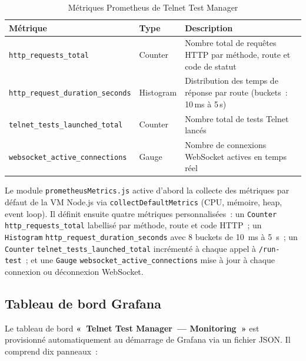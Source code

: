 \begin{table}[H]
  \centering
  \caption{Métriques Prometheus de Telnet Test Manager}
  \label{tab:prometheus_metrics}
  \begin{tabularx}{\textwidth}{|L{6.2cm}|L{2.3cm}|X|}
    \hline
    \textbf{Métrique} & \textbf{Type} & \textbf{Description} \\
    \hline
    {\small\texttt{http\_requests\_total}} & Counter &
      Nombre total de requêtes HTTP par méthode, route et code de statut \\
    \hline
    {\small\texttt{http\_request\_duration\_seconds}} & Histogram &
      Distribution des temps de réponse par route (buckets~: 10\,ms à 5\,s) \\
    \hline
    {\small\texttt{telnet\_tests\_launched\_total}} & Counter &
      Nombre total de tests Telnet lancés \\
    \hline
    {\small\texttt{websocket\_active\_connections}} & Gauge &
      Nombre de connexions WebSocket actives en temps réel \\
    \hline
  \end{tabularx}
\end{table}

Le module \texttt{prometheusMetrics.js} active d'abord la collecte des métriques
par défaut de la VM Node.js via \texttt{collectDefaultMetrics} (CPU, mémoire, heap,
event loop). Il définit ensuite quatre métriques personnalisées~: un \texttt{Counter}
\texttt{http\_requests\_total} labellisé par méthode, route et code HTTP~; un
\texttt{Histogram} \texttt{http\_request\_duration\_seconds} avec 8 buckets de
10~ms à 5~s~; un \texttt{Counter} \texttt{telnet\_tests\_launched\_total} incrémenté
à chaque appel à \texttt{/run-test}~; et une \texttt{Gauge}
\texttt{websocket\_active\_connections} mise à jour à chaque connexion ou
déconnexion WebSocket.

\subsection{Tableau de bord Grafana}

Le tableau de bord \textbf{«~Telnet Test Manager~--- Monitoring~»} est
provisionné automatiquement au démarrage de Grafana via un fichier JSON.
Il comprend dix panneaux~:

